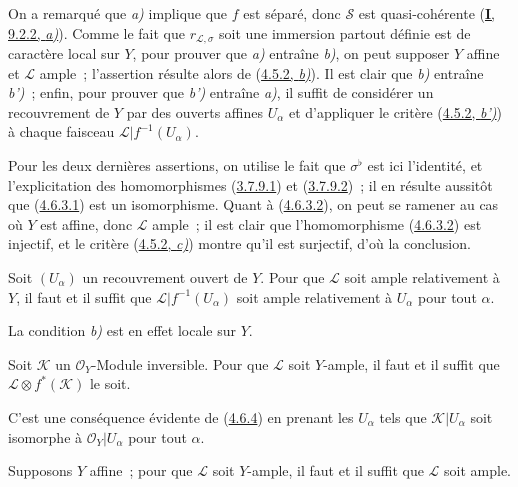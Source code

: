 On a remarqué que \emph{a)} implique que $f$ est séparé, donc $\mathcal{S}$ est
quasi-cohérente (\hyperref[I.9.2.2-fr]{\textbf{I}, 9.2.2, \emph{a)}}). Comme le fait que
$r_{\mathcal{L},\sigma}$ soit une immersion partout définie est de
caractère local sur $Y$, pour prouver que \emph{a)} entraîne \emph{b)}, on peut supposer
$Y$ affine et $\mathcal{L}$ ample~;
l'assertion résulte alors de (\hyperref[II.4.5.2-fr]{4.5.2, \emph{b)}}). Il est
clair que \emph{b)} entraîne \emph{b')}~; enfin, pour prouver que \emph{b')} entraîne \emph{a)}, il
suffit de considérer un recouvrement de $Y$ par des ouverts affines
$U_\alpha$ et d'appliquer le critère
(\hyperref[II.4.5.2-fr]{4.5.2, \emph{b')}}) à chaque faisceau
$\mathcal{L}|f^{-1}(U_\alpha)$.

Pour les deux dernières assertions, on utilise le fait que
$\sigma^\flat$ est ici l'identité, et l'explicitation des homomorphismes
(\hyperref[II.3.7.9.1-fr]{3.7.9.1}) et
(\hyperref[II.3.7.9.2-fr]{3.7.9.2})~; il en résulte aussitôt que
(\hyperref[II.4.6.3.1-fr]{4.6.3.1}) est un isomorphisme. Quant à
(\hyperref[II.4.6.3.2-fr]{4.6.3.2}), on peut se ramener au cas où $Y$ est
affine, donc $\mathcal{L}$ ample~; il est clair que l'homomorphisme
(\hyperref[II.4.6.3.2-fr]{4.6.3.2}) est injectif, et le critère
(\hyperref[II.4.5.2-fr]{4.5.2, \emph{c)}}) montre qu'il est surjectif, d'où la
conclusion.

\begin{corollary}[4.6.4]
\label{II.4.6.4-fr}
Soit $(U_\alpha)$ un recouvrement ouvert de $Y$. Pour que $\mathcal{L}$
soit ample relativement à $Y$, il faut et il suffit que
$\mathcal{L}|f^{-1}(U_\alpha)$ soit ample relativement à $U_\alpha$ pour
tout $\alpha$.
\end{corollary}

La condition \emph{b)} est en effet locale sur $Y$.

\begin{corollary}[4.6.5]
\label{II.4.6.5-fr}
Soit $\mathcal{K}$ un $\mathcal{O}_Y$-Module inversible. Pour que
$\mathcal{L}$ soit $Y$-ample, il faut et il suffit que
$\mathcal{L}\otimes f^*(\mathcal{K})$ le soit.
\end{corollary}

C'est une conséquence évidente de (\hyperref[II.4.6.4-fr]{4.6.4}) en
prenant les $U_\alpha$ tels que $\mathcal{K}|U_\alpha$ soit isomorphe à
$\mathcal{O}_Y|U_\alpha$ pour tout $\alpha$.

\begin{corollary}[4.6.6]
\label{II.4.6.6-fr}
Supposons $Y$ affine~; pour que $\mathcal{L}$ soit $Y$-ample, il faut et il
suffit que $\mathcal{L}$ soit ample.
\end{corollary}

